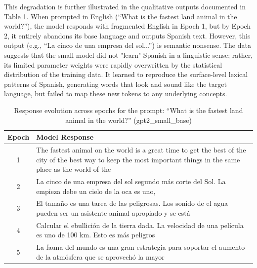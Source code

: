 This degradation is further illustrated in the qualitative outputs documented in Table \ref{tab:response_evolution}. When prompted in English (``What is the fastest land animal in the world?''), the model responds with fragmented English in Epoch 1, but by Epoch 2, it entirely abandons its base language and outputs Spanish text. However, this output (e.g., ``La cinco de una empresa del sol...'') is semantic nonsense. The data suggests that the small model did not "learn" Spanish in a linguistic sense; rather, its limited parameter weights were rapidly overwritten by the statistical distribution of the training data. It learned to reproduce the surface-level lexical patterns of Spanish, generating words that look and sound like the target language, but failed to map these new tokens to any underlying concepts.

\begin{table}[htpb]
\centering
\caption{Response evolution across epochs for the prompt: ``What is the fastest land animal in the world?'' (gpt2\_small\_base)}
\label{tab:response_evolution}
\begin{tabularx}{\linewidth}{@{} c X @{}}
\toprule
\textbf{Epoch} & \textbf{Model Response} \\ \midrule

1 & The fastest animal on the world is a great time to get the best of the city of the best way to keep the most important things in the same place as the world of the \\ \addlinespace

2 & La cinco de una empresa del sol segundo más corte del Sol. La empieza debe un cielo de la oca es uno, \\ \addlinespace

3 & El tamaño es una tarea de las peligrosas. Los sonido de el agua pueden ser un asistente animal apropiado y se está \\ \addlinespace

4 & Calcular el ebullición de la tierra dada. La velocidad de una película es uno de 100 km. Esto es más peligros \\ \addlinespace

5 & La fauna del mundo es una gran estrategia para soportar el aumento de la atmósfera que se aprovechó la mayor \\ \bottomrule
\end{tabularx}
\end{table}

